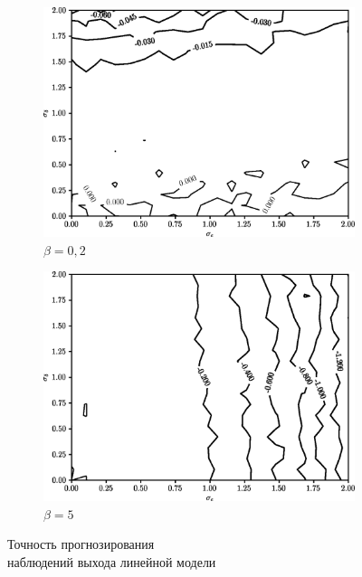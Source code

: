\begin{figure}[h]
  \begin{subfigure}[b]{\linewidth}
    \centering
    \includegraphics[width=135mm]{fig/linear/predict/beta-0,2_predict-measured.png}
    \caption{\( \beta = 0{,}2 \)}
  \end{subfigure}

  \vspace{2\baselineskip}
  \begin{subfigure}[b]{\linewidth}
    \centering
    \includegraphics[width=135mm]{fig/linear/predict/beta-5_predict-measured.png}
    \caption{\( \beta = 5 \)}
  \end{subfigure}

  \vspace{\baselineskip}
  \caption{%
    Точность прогнозирования \\
    наблюдений выхода линейной модели
  }\label{fig:comparison_linear_predict}
\end{figure}
